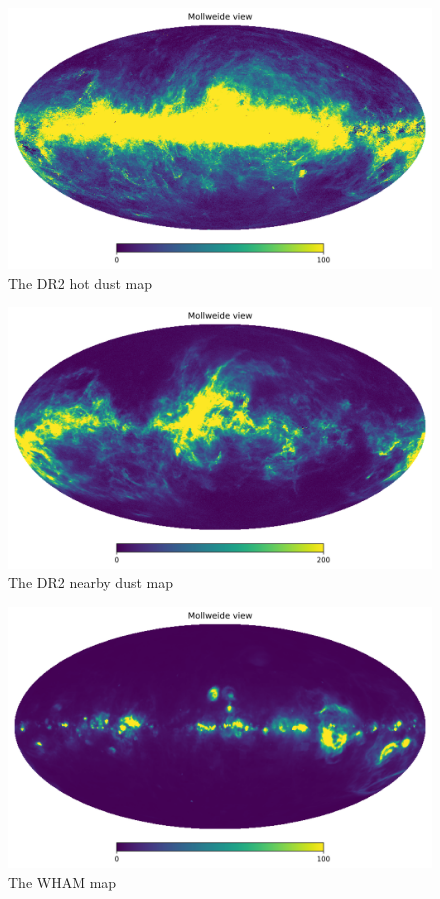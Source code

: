 \documentclass{aa}
\begin{document}
\begin{figure}
  \centering
  \includegraphics[width=\columnwidth]{figures/hot_dust.png}
  \caption{The DR2 hot dust map}
  \label{fig:hot_dust}
\end{figure}
\begin{figure}
  \centering
  \includegraphics[width=\columnwidth]{figures/nearby_dust.png}
  \caption{The DR2 nearby dust map}
  \label{fig:nearby_dust}
\end{figure}
\begin{figure}
  \centering
  \includegraphics[width=\columnwidth]{figures/wham.png}
  \caption{The WHAM map}
  \label{fig:wham}
\end{figure}
\end{document}
